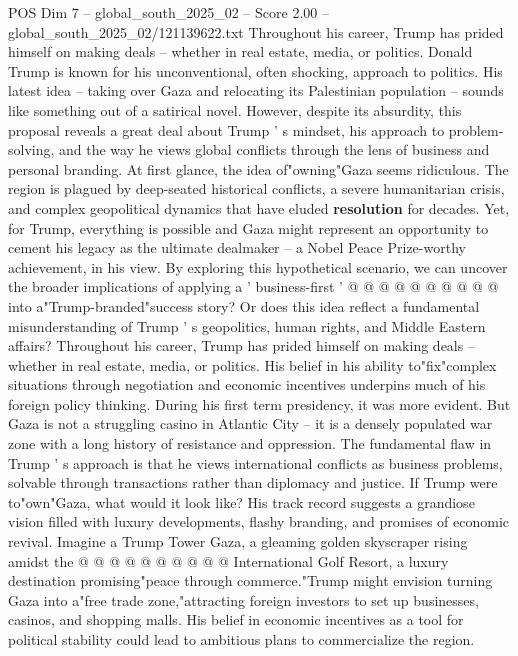 \begin{textsample}{POS Dim 7 – global\_south\_2025\_02 – Score 2.00 – global\_south\_2025\_02/121139622.txt}  \label{ex:f7_pos_186}
Throughout his career, Trump has prided himself on making deals -- whether in real estate, media, or politics.
Donald Trump is known for his unconventional, often shocking, approach to politics.
His latest idea -- taking over Gaza and relocating its Palestinian population -- sounds like something out of a satirical novel.
However, despite its absurdity, this proposal reveals a great deal about Trump ' s mindset, his approach to problem-solving, and the way he views global conflicts through the lens of business and personal branding.
At first glance, the idea of"owning"Gaza seems ridiculous.
The region is plagued by deep-seated historical conflicts, a severe humanitarian crisis, and complex geopolitical dynamics that have eluded \textbf{resolution} for decades.
Yet, for Trump, everything is possible and Gaza might represent an opportunity to cement his legacy as the ultimate dealmaker -- a Nobel Peace Prize-worthy achievement, in his view.
By exploring this hypothetical scenario, we can uncover the broader implications of applying a ' business-first ' @ @ @ @ @ @ @ @ @ @ into a"Trump-branded"success story?
Or does this idea reflect a fundamental misunderstanding of Trump ' s geopolitics, human rights, and Middle Eastern affairs?
Throughout his career, Trump has prided himself on making deals -- whether in real estate, media, or politics.
His belief in his ability to"fix"complex situations through negotiation and economic incentives underpins much of his foreign policy thinking.
During his first term presidency, it was more evident.
But Gaza is not a struggling casino in Atlantic City -- it is a densely populated war zone with a long history of resistance and oppression.
The fundamental flaw in Trump ' s approach is that he views international conflicts as business problems, solvable through transactions rather than diplomacy and justice.
If Trump were to"own"Gaza, what would it look like?
His track record suggests a grandiose vision filled with luxury developments, flashy branding, and promises of economic revival.
Imagine a Trump Tower Gaza, a gleaming golden skyscraper rising amidst the @ @ @ @ @ @ @ @ @ @ International Golf Resort, a luxury destination promising"peace through commerce."Trump might envision turning Gaza into a"free trade zone,"attracting foreign investors to set up businesses, casinos, and shopping malls.
His belief in economic incentives as a tool for political stability could lead to ambitious plans to commercialize the region.

\end{textsample}
